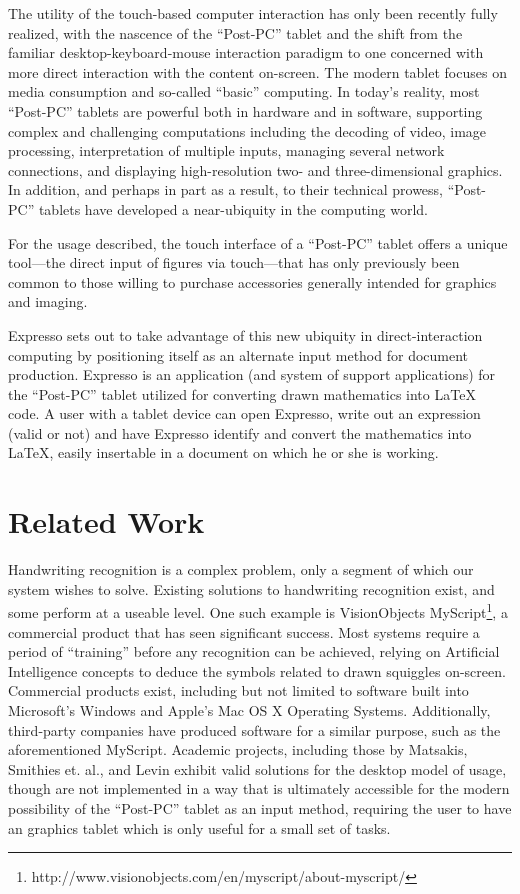 \documentclass{acm_proc_article-sp}
\begin{document}
The utility of the touch-based computer interaction has only been recently fully realized, with the nascence of the ``Post-PC'' tablet and the shift from the familiar desktop-keyboard-mouse interaction paradigm to one concerned with more direct interaction with the content on-screen. The modern tablet focuses on media consumption and so-called ``basic'' computing. In today's reality, most ``Post-PC'' tablets are powerful both in hardware and in software, supporting complex and challenging computations including the decoding of video, image processing, interpretation of multiple inputs, managing several network connections, and displaying high-resolution two- and three-dimensional graphics. In addition, and perhaps in part as a result, to their technical prowess, ``Post-PC'' tablets have developed a near-ubiquity in the computing world.

For the usage described, the touch interface of a ``Post-PC'' tablet offers a unique tool---the direct input of figures via touch---that has only previously been common to those willing to purchase accessories generally intended for graphics and imaging.

Expresso sets out to take advantage of this new ubiquity in direct-interaction computing by positioning itself as an alternate input method for document production. Expresso is an application (and system of support applications) for the ``Post-PC'' tablet utilized for converting drawn mathematics into \LaTeX{} code. A user with a tablet device can open Expresso, write out an expression (valid or not) and have Expresso identify and convert the mathematics into \LaTeX{}, easily insertable in a document on which he or she is working.

\section{Related Work}
Handwriting recognition is a complex problem, only a segment of which our system wishes to solve. Existing solutions to handwriting recognition exist, and some perform at a useable level. One such example is VisionObjects MyScript\footnote{http://www.visionobjects.com/en/myscript/about-myscript/}, a commercial product that has seen significant success. Most systems require a period of ``training'' before any recognition can be achieved, relying on Artificial Intelligence concepts to deduce the symbols related to drawn squiggles on-screen. Commercial products exist, including but not limited to software built into Microsoft's Windows and Apple's Mac OS X Operating Systems. Additionally, third-party companies have produced software for a similar purpose, such as the aforementioned MyScript. Academic projects, including those by Matsakis\cite{matsakis_recognition_1999}, Smithies et. al.\cite{smithies_handwriting-based_1999}, and Levin\cite{levin_cellwriter:_2007} exhibit valid solutions for the desktop model of usage, though are not implemented in a way that is ultimately accessible for the modern possibility of the ``Post-PC'' tablet as an input method, requiring the user to have an graphics tablet which is only useful for a small set of tasks. 
\end{document}
